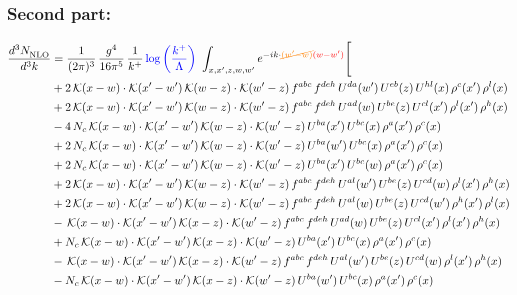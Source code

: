 \documentclass[9pt]{article}
\numberwithin{equation}{section}
\begin{document}
\subsubsection{Second part:}
\begin{align}
\frac{d^{3}N_{\rm NLO}^{\rm}}{d^{3}k}  & = \frac{1}{(2\pi)^{3}}\,\frac{g^{4}}{16\pi^{5}}\,\frac{1}{k^{+}}\,{\color{blue}\log{\left(\frac{k^{+}}{\Lambda}\right)}}\,\,\int_{x,x',z,w,w'}e^{-ik\cdot{\color{orange}\cancel{(w'-w)}}{\color{red}(w-w')}}\Bigg[\notag\\ &+2\,\mathcal{K}(x-w)\cdot\mathcal{K}(x'-w')\,\mathcal{K}(w-z)\cdot\mathcal{K}(w'-z)\,f^{abc}\,f^{deh}\,U^{da}(w')\,U^{eb}(z)\,U^{hl}(x)\,\rho^{c}(x')\,\rho^{l}(x)\notag\\
&+2\,\mathcal{K}(x-w)\cdot\mathcal{K}(x'-w')\,\mathcal{K}(w-z)\cdot\mathcal{K}(w'-z)\,f^{abc}\,f^{deh}\,U^{ad}(w)\,U^{be}(z)\,U^{cl}(x')\,\rho^{l}(x')\,\rho^{h}(x)\notag\\
&-4\,N_{c}\,\mathcal{K}(x-w)\cdot\mathcal{K}(x'-w')\,\mathcal{K}(w-z)\cdot\mathcal{K}(w'-z)\,U^{ba}(x')\,U^{bc}(x)\,\rho^{a}(x')\,\rho^{c}(x)\notag\\
&+2\,N_{c}\,\mathcal{K}(x-w)\cdot\mathcal{K}(x'-w')\,\mathcal{K}(w-z)\cdot\mathcal{K}(w'-z)\,U^{ba}(w')\,U^{bc}(x)\,\rho^{a}(x')\,\rho^{c}(x)\notag\\
&+2\,N_{c}\,\mathcal{K}(x-w)\cdot\mathcal{K}(x'-w')\,\mathcal{K}(w-z)\cdot\mathcal{K}(w'-z)\,U^{ba}(x')\,U^{bc}(w)\,\rho^{a}(x')\,\rho^{c}(x)\notag\\
&+2\,\mathcal{K}(x-w)\cdot\mathcal{K}(x'-w')\,\mathcal{K}(w-z)\cdot\mathcal{K}(w'-z)\,f^{abc}\,f^{deh}\,U^{al}(w')\,U^{be}(z)\,U^{cd}(w)\,\rho^{l}(x')\,\rho^{h}(x)\notag\\
&+2\,\mathcal{K}(x-w)\cdot\mathcal{K}(x'-w')\,\mathcal{K}(w-z)\cdot\mathcal{K}(w'-z)\,f^{abc}\,f^{deh}\,U^{al}(w)\,U^{be}(z)\,U^{cd}(w')\,\rho^{h}(x')\,\rho^{l}(x)\notag\\
&-\,\mathcal{K}(x-w)\cdot\mathcal{K}(x'-w')\,\mathcal{K}(x-z)\cdot\mathcal{K}(w'-z)\,f^{abc}\,f^{deh}\,U^{ad}(w)\,U^{be}(z)\,U^{cl}(x')\,\rho^{l}(x')\,\rho^{h}(x)\notag\\
&+N_{c}\,\mathcal{K}(x-w)\cdot\mathcal{K}(x'-w')\,\mathcal{K}(x-z)\cdot\mathcal{K}(w'-z)\,U^{ba}(x')\,U^{bc}(x)\,\rho^{a}(x')\,\rho^{c}(x)\notag\\
&-\,\mathcal{K}(x-w)\cdot\mathcal{K}(x'-w')\,\mathcal{K}(x-z)\cdot\mathcal{K}(w'-z)\,f^{abc}\,f^{deh}\,U^{al}(w')\,U^{be}(z)\,U^{cd}(w)\,\rho^{l}(x')\,\rho^{h}(x)\notag\\
&-N_{c}\,\mathcal{K}(x-w)\cdot\mathcal{K}(x'-w')\,\mathcal{K}(x-z)\cdot\mathcal{K}(w'-z)\,U^{ba}(w')\,U^{bc}(x)\,\rho^{a}(x')\,\rho^{c}(x)\notag\\

\end{align}
\end{document}
